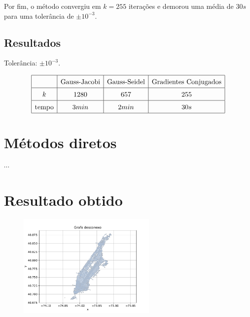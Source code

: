 \documentclass{article}
\begin{document}
    Por fim, o método convergiu em $k = 255$ iterações e demorou uma média de $30s$ para uma tolerância de $\pm 10^{-3}$.

    \subsection{Resultados}

    Tolerância: $\pm 10^{-3}$.

    \[\renewcommand{\arraystretch}{1.5}
    \begin{array}{|c|c|c|c|}
        \hline
        & \text{Gauss-Jacobi} & \text{Gauss-Seidel} & \text{Gradientes Conjugados}\\
        \hline
        k & 1280 & 657 & 255\\
        \hline
        \text{tempo} & 3min & 2min & 30s\\
        \hline
    \end{array}\]

    \section{Métodos diretos}

    $\cdots$

    \section{Resultado obtido}

    \begin{figure}[ht]
        \centering
        \includegraphics[width=0.6\textwidth, trim={0 .3cm 0 .9cm},clip]{../figs/fig1.pdf}
    \end{figure}

    \newpage
\end{document}
